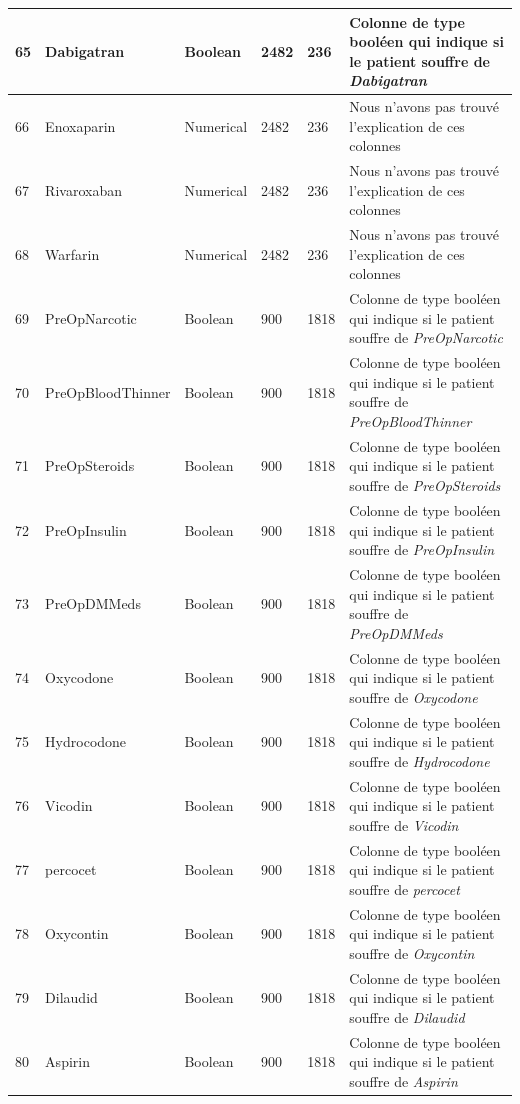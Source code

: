 \documentclass[12pt, french]{report}
\begin{document}
\begin{longtable}{| p{} | p{} | p{} | p{}  | p{} | p{} |  }
65 &	Dabigatran & Boolean & 2482 & 236& Colonne de type booléen qui indique si le patient souffre  de \textit{Dabigatran} \\ \hline 
66 &	Enoxaparin & Numerical & 2482 & 236 & Nous n’avons pas trouvé l’explication de ces colonnes \\ \hline 
67 &	Rivaroxaban & Numerical & 2482 & 236 & Nous n’avons pas trouvé l’explication de ces colonnes \\ \hline 
68 &	Warfarin & Numerical & 2482 & 236 & Nous n’avons pas trouvé l’explication de ces colonnes \\ \hline 
69 &	PreOpNarcotic & Boolean & 900 & 1818& Colonne de type booléen qui indique si le patient souffre  de \textit{PreOpNarcotic} \\ \hline 
70 &	PreOpBloodThinner & Boolean & 900 & 1818& Colonne de type booléen qui indique si le patient souffre  de \textit{PreOpBloodThinner} \\ \hline 
71 &	PreOpSteroids & Boolean & 900 & 1818& Colonne de type booléen qui indique si le patient souffre  de \textit{PreOpSteroids} \\ \hline 
72 &	PreOpInsulin & Boolean & 900 & 1818& Colonne de type booléen qui indique si le patient souffre  de \textit{PreOpInsulin} \\ \hline 
73 &	PreOpDMMeds & Boolean & 900 & 1818& Colonne de type booléen qui indique si le patient souffre  de \textit{PreOpDMMeds} \\ \hline 
74 &	Oxycodone & Boolean & 900 & 1818& Colonne de type booléen qui indique si le patient souffre  de \textit{Oxycodone} \\ \hline 
75 &	Hydrocodone & Boolean & 900 & 1818& Colonne de type booléen qui indique si le patient souffre  de \textit{Hydrocodone} \\ \hline 
76 &	Vicodin & Boolean & 900 & 1818& Colonne de type booléen qui indique si le patient souffre  de \textit{Vicodin} \\ \hline 
77 &	percocet & Boolean & 900 & 1818& Colonne de type booléen qui indique si le patient souffre  de \textit{percocet} \\ \hline 
78 &	Oxycontin & Boolean & 900 & 1818& Colonne de type booléen qui indique si le patient souffre  de \textit{Oxycontin} \\ \hline 
79 &	Dilaudid & Boolean & 900 & 1818& Colonne de type booléen qui indique si le patient souffre  de \textit{Dilaudid} \\ \hline 
80 &	Aspirin & Boolean & 900 & 1818& Colonne de type booléen qui indique si le patient souffre  de \textit{Aspirin} \\ \hline 

\end{longtable}
\end{document}
